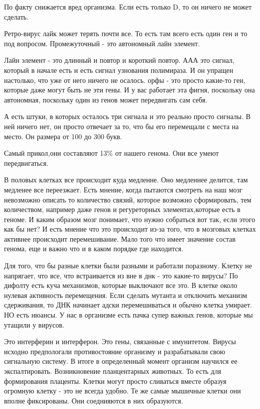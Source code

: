 По факту снижается вред организма. Если есть только D, то он ничего не может сделать. 

Ретро-вирус лайк может терять почти все. То есть там всего есть один ген и то 
под вопросом. Промежуточный - это автономный лайн элемент. 

Лайн элемент - это длинный и повтор
и короткий повтор. ААА это сигнал, который в начале
есть и есть сигнал узнования полимираза. И он упращен настолько,
что уже от него ничего не осалось. орфы - это просто какие-то
ген, которые даже могут быть не эти гены. И у вас работает эта фигня,
поскольку она автономная, поскольку один из генов может передвигать сам себя.

А есть штуки, в которых осталось три сигнала и это
реально просто сигналы. В ней ничего нет, он просто отвечает за то,
что бы его перемещали с места на место. Он размера от 100 до 300 букв.

Самый прикол,они составляют 13\% от нашего генома. Они все умеют передвигаться.

В половых клетках все происходит куда медленне. Оно медленнее делится, там медленее все переезжает.
Есть мнение, когда пытаются смотреть на наш мозг невозможно описать
то количество связий, которое возможно сформировать, тем количеством, например даже
генов и регуреторных элементах,которые есть в геноме. И каким образом мозг понимает,
что нужно собраться вот так, если этого как бы нет? И  есть мнение что это происходит
из-за того, что в мозговых клетках активнее происходит перемешивание.
Мало того что имеет значение состав генома, еще и важно что и в каком порядке где находится.

Для того, что бы разные клетки были разными и работали поразному. Клетку не напрягает, что 
все, что встраивается из вне в днк - это какие-то вирусы? По дифолту есть 
куча механизмов, которые выключают все это. В клетке около нулевая 
активность перемещения. Если сделать мутанта и отключить 
механизм сдерживания, то ДНК начинает адски перемешиваться 
и обычно клетка умирает. НО есть 
нюансы. У нас в организме есть 
пачка супер важных генов, которые мы утащили у вирусов. 

Это интерферин и интерферон. Это гены, связанные с имунитетом. Вирусы исходно 
предпологали противостояние организму и разрабатывали свою 
сигнальную систему. В итоге в определенный момент организм научился 
ее экспалтировать. Возникновение планцентарных животных. То есть 
для формирования плаценты. Клетки могут просто сливаться 
вместе образуя огромную клетку - это не всегда 
удобно. Те же самые мышичные клетки они вполне фиксированы. 
Они соеднияются в них образуются. 

